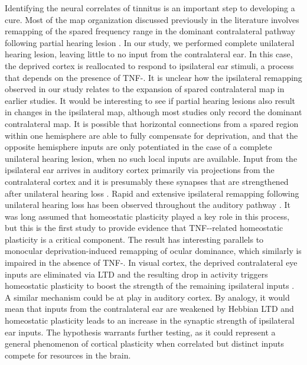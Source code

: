  Identifying the neural correlates of tinnitus is an important step to developing a cure. Most of the map organization discussed previously in the literature involves remapping of the spared frequency range in the dominant contralateral pathway following partial hearing lesion \cite{Robertson1989, Norena2005, Dong2010}. In our study, we performed complete unilateral hearing lesion, leaving little to no input from the contralateral ear. In this case, the deprived cortex is reallocated to respond to ipsilateral ear stimuli, a process that depends on the presence of TNF-\textalpha{}. It is unclear how the ipsilateral remapping observed in our study relates to the expansion of spared contralateral map in earlier studies. It would be interesting to see if partial hearing lesions also result in changes in the ipsilateral map, although most studies only record the dominant contralateral map. It is possible that horizontal connections from a spared region within one hemisphere are able to fully compensate for deprivation, and that the opposite hemisphere inputs are only potentiated in the case of a complete unilateral hearing lesion, when no such local inputs are available. Input from the ipsilateral ear arrives in auditory cortex primarily via projections from the contralateral cortex and it is presumably these synapses that are strengthened after unilateral hearing loss \cite{Yorke1975}. Rapid and extensive ipsilateral remapping following unilateral hearing loss has been observed throughout the auditory pathway \cite{Mossop2000}. It was long assumed that homeostatic plasticity played a key role in this process, but this is the first study to provide evidence that TNF-\textalpha{}-related homeostatic plasticity is a critical component. The result has interesting parallels to monocular deprivation-induced remapping of ocular dominance, which similarly is impaired in the absence of TNF-\textalpha{}. In visual cortex, the deprived contralateral eye inputs are eliminated via LTD and the resulting drop in activity triggers homeostatic plasticity to boost the strength of the remaining ipsilateral inputs \cite{Kaneko2008}. A similar mechanism could be at play in auditory cortex. By analogy, it would mean that inputs from the contralateral ear are weakened by Hebbian LTD and homeostatic plasticity leads to an increase in the synaptic strength of ipsilateral ear inputs. The hypothesis warrants further testing, as it could represent a general phenomenon of cortical plasticity when correlated but distinct inputs compete for resources in the brain.

\printbibliography